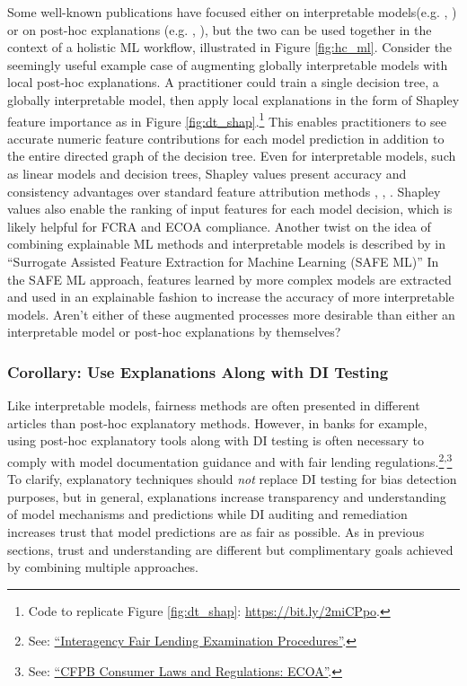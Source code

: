 \documentclass{article}
\begin{document}
Some well-known publications have focused either on interpretable models(e.g. \citet{slim}, \citet{sbrl}) or on post-hoc explanations (e.g.  \citet{shapley}, \citet{lime}), but the two can be used together in the context of a holistic ML workflow, illustrated in Figure \ref{fig:hc_ml}. Consider the seemingly useful example case of augmenting globally interpretable models with local post-hoc explanations. A practitioner could train a single decision tree, a globally interpretable model, then apply local explanations in the form of Shapley feature importance as in Figure \ref{fig:dt_shap}.\footnote{\scriptsize{Code to replicate Figure \ref{fig:dt_shap}: \url{https://bit.ly/2miCPpo}.}} This enables practitioners to see accurate numeric feature contributions for each model prediction in addition to the entire directed graph of the decision tree. Even for interpretable models, such as linear models and decision trees, Shapley values present accuracy and consistency advantages over standard feature attribution methods \cite{lipovetsky2001analysis}, \cite{tree_shap}, \cite{shapley}. Shapley values also enable the ranking of input features for each model decision, which is likely helpful for FCRA and ECOA compliance. Another twist on the idea of combining explainable ML methods and interpretable models is described by \citet{gosiewska2019safe} in ``Surrogate Assisted Feature Extraction for Machine Learning (SAFE ML)''  In the SAFE ML approach, features learned by more complex models are extracted and used in an explainable fashion to increase the accuracy of more interpretable models. Aren't either of these augmented processes more desirable than either an interpretable model or post-hoc explanations by themselves?

\subsubsection{Corollary: Use Explanations Along with DI Testing} \label{cor:ex_di}

Like interpretable models, fairness methods are often presented in different articles than post-hoc explanatory methods. However, in banks for example, using post-hoc explanatory tools along with DI testing is often necessary to comply with model documentation guidance and with fair lending regulations.\footnote{\scriptsize{See: \href{https://www.ffiec.gov/pdf/fairlend.pdf}{``Interagency Fair Lending Examination Procedures''}.}}\textsuperscript{,}\footnote{\scriptsize{See: \href{https://files.consumerfinance.gov/f/documents/201510_cfpb_ecoa-narrative-and-procedures.pdf}{``CFPB Consumer Laws and Regulations: ECOA''}.}} To clarify, explanatory techniques should \textit{not} replace DI testing for bias detection purposes, but in general, explanations increase transparency and understanding of model mechanisms and predictions while DI auditing and remediation increases trust that model predictions are as fair as possible. As in previous sections, trust and understanding are different but complimentary goals achieved by combining multiple approaches.
\end{document}
